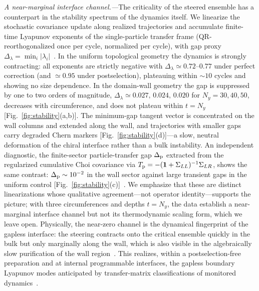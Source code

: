\documentclass[aps,prl,twocolumn,floatfix,superscriptaddress,nofootinbib]{revtex4-2}
\newcommand{\Dlam}{\Delta_{\lambda}}
\newcommand{\Dp}{\Delta_{\rm p}}
\begin{document}
\emph{A near-marginal interface channel.---}The criticality of the steered ensemble has a counterpart in the stability spectrum of the dynamics itself.  We linearize the stochastic covariance update along realized trajectories and accumulate finite-time Lyapunov exponents of the single-particle transfer frame (QR-reorthogonalized once per cycle, normalized per cycle), with gap proxy $\Dlam=\min_i|\lambda_i|$~\cite{Ludwig2013,SM}.  In the uniform topological geometry the dynamics is strongly contracting: all exponents are strictly negative with $\Dlam\simeq0.72$--$0.77$ under perfect correction (and $\simeq0.95$ under postselection), plateauing within ${\sim}10$ cycles and showing no size dependence.  In the domain-wall geometry the gap is suppressed by one to two orders of magnitude, $\Dlam\simeq0.027,\,0.024,\,0.020$ for $N_y=30,40,50$, decreases with circumference, and does not plateau within $t=N_y$ [Fig.~\ref{fig:stability}(a,b)].  The minimum-gap tangent vector is concentrated on the wall columns and extended along the wall, and trajectories with smaller gaps carry degraded Chern markers [Fig.~\ref{fig:stability}(d)]---a slow, neutral deformation of the chiral interface rather than a bulk instability.  An independent diagnostic, the finite-sector particle-transfer gap $\Dp$ extracted from the regularized cumulative Choi covariance via $T_{\rm p}=-(\mathbf{1}+\Sigma_{LL})^{-1}\Sigma_{LR}$, shows the same contrast: $\Dp\sim10^{-2}$ in the wall sector against large transient gaps in the uniform control [Fig.~\ref{fig:stability}(c)]~\cite{SM}.  We emphasize that these are distinct linearizations whose qualitative agreement---not operator identity---supports the picture; with three circumferences and depths $t=N_y$, the data establish a near-marginal interface channel but not its thermodynamic scaling form, which we leave open.  Physically, the near-zero channel is the dynamical fingerprint of the gapless interface: the steering contracts onto the critical ensemble quickly in the bulk but only marginally along the wall, which is also visible in the algebraically slow purification of the wall region~\cite{BhuiyanPanJian2026}.  This realizes, within a postselection-free preparation and at internal programmable interfaces, the gapless boundary Lyapunov modes anticipated by transfer-matrix classifications of monitored dynamics~\cite{XiaoKawabata2024,Oshima2025}.
\end{document}
